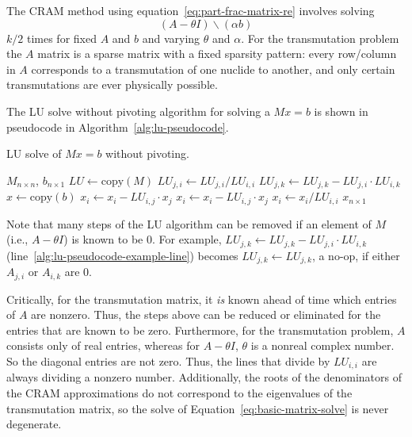 The CRAM method using equation~\ref{eq:part-frac-matrix-re} involves solving
\begin{equation}
\label{eq:basic-matrix-solve}
 (A - \theta I)\backslash(\alpha b)
\end{equation}
$k/2$ times for fixed $A$ and $b$ and varying $\theta$ and $\alpha$. For the
transmutation problem the $A$ matrix is a sparse matrix with a fixed sparsity
pattern: every row/column in $A$ corresponds to a transmutation of one nuclide
to another, and only certain transmutations are ever physically possible.

The LU solve without pivoting algorithm for solving a $Mx=b$ is shown in
pseudocode in Algorithm~\ref{alg:lu-pseudocode}.
\begin{algorithm}
  \caption{LU solve of $Mx=b$ without pivoting.}\label{alg:lu-pseudocode}
  \begin{algorithmic}[1]
  \REQUIRE $M_{n\times n}$, $b_{n\times 1}$
  \STATE {}
  \STATE {}
  \STATE
  \STATE $LU \leftarrow \mathrm{copy}(M)$
  \STATE
          \STATE $LU_{j, i} \leftarrow LU_{j, i}/LU_{i, i}$
              \STATE $LU_{j, k} \leftarrow LU_{j, k} - LU_{j, i}\cdot LU_{i, k}$\label{alg:lu-pseudocode-example-line}
          \ENDFOR
      \ENDFOR
  \ENDFOR
  \STATE
  \STATE {}
  \STATE $x \leftarrow \mathrm{copy}(b)$
  \STATE
  \STATE {}
          \STATE $x_i \leftarrow x_i - LU_{i, j}\cdot x_j$
      \ENDFOR
  \ENDFOR
  \STATE
  \STATE {}
          \STATE $x_i \leftarrow x_i -LU_{i, j}\cdot x_j$
      \ENDFOR
      \STATE $x_i \leftarrow x_i/LU_{i, i}$
  \ENDFOR
  \STATE
  \ENSURE $x_{n\times 1}$

\end{algorithmic}
\end{algorithm}

Note that many steps of the LU algorithm can be removed if an element of $M$
(i.e., $A - \theta I$) is known to be 0. For example,
$LU_{j, k} \leftarrow LU_{j, k} - LU_{j, i}\cdot LU_{i, k}$
(line~\ref{alg:lu-pseudocode-example-line}) becomes
$LU_{j, k} \leftarrow LU_{j, k}$, a no-op, if either $A_{j, i}$ or $A_{i, k}$
are 0.

Critically, for the transmutation matrix, it \textit{is} known ahead of time
which entries of $A$ are nonzero. Thus, the steps above can be reduced or
eliminated for the entries that are known to be zero. Furthermore, for the
transmutation problem, $A$ consists only of real entries, whereas for
$A - \theta I$, $\theta$ is a nonreal complex number. So the diagonal entries
are not zero. Thus, the lines that divide by $LU_{i,i}$ are always dividing a
nonzero number.  Additionally, the roots of the denominators of the CRAM
approximations do not correspond to the eigenvalues of the transmutation
matrix, so the solve of Equation~\ref{eq:basic-matrix-solve} is never
degenerate.

